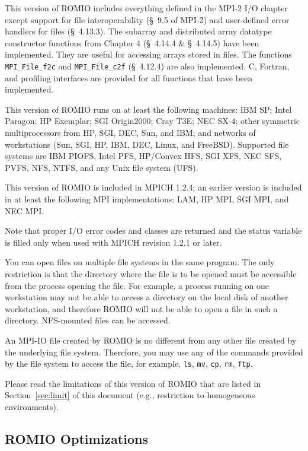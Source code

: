 This version of ROMIO includes everything defined in the MPI-2 I/O
chapter except support for file interoperability (\S~9.5 of MPI-2) and
user-defined error handlers for files (\S~4.13.3).  The subarray and
distributed array datatype constructor functions from Chapter 4
(\S~4.14.4 \& \S~4.14.5) have been implemented. They are useful for
accessing arrays stored in files. The functions {\tt MPI\_File\_f2c}
and {\tt MPI\_File\_c2f} (\S~4.12.4) are also implemented.  C,
Fortran, and profiling interfaces are provided for all functions that
have been implemented.

This version of ROMIO runs on at least the following machines: IBM SP; Intel
Paragon; HP Exemplar; SGI Origin2000; Cray T3E; NEC SX-4; other
symmetric multiprocessors from HP, SGI, DEC, Sun, and IBM; and networks of
workstations (Sun, SGI, HP, IBM, DEC, Linux, and FreeBSD).
Supported file systems are IBM PIOFS, Intel PFS, HP/Convex
HFS, SGI XFS, NEC SFS, PVFS, NFS, NTFS, and any Unix file system (UFS).

This version of ROMIO is included in MPICH 1.2.4; an earlier version
is included in at least the following MPI implementations: LAM, HP
MPI, SGI MPI, and NEC MPI. 

Note that proper I/O error codes and classes are returned and the status
variable is filled only when used with MPICH revision 1.2.1 or later.

You can open files on multiple file systems in the same program. The
only restriction is that the directory where the file is to be opened
must be accessible from the process opening the file. For example, a
process running on one workstation may not be able to access a
directory on the local disk of another workstation, and therefore
ROMIO will not be able to open a file in such a directory. NFS-mounted
files can be accessed.

An MPI-IO file created by ROMIO is no different from any other file
created by the underlying file system. Therefore, you may use any of
the commands provided by the file system to access the file, for example,
{\tt ls}, {\tt mv}, {\tt cp}, {\tt rm}, {\tt ftp}.

Please read the limitations of this version of ROMIO that are listed
in Section~\ref{sec:limit} of this document (e.g., restriction to homogeneous
environments). 

\subsection{ROMIO Optimizations}
\label{sec:opt}

